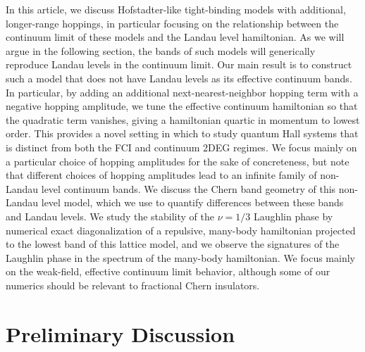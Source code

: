 \documentclass[aps,prb,twocolumn,letterpaper,twoside,nobalancelastpage,groupedaddress,amsmath,amssymb,floatfix,citeautoscript]{revtex4-1}
\begin{document}
In this article, we discuss Hofstadter-like tight-binding models with additional, longer-range hoppings, in particular focusing on the relationship between the continuum limit of these models and the Landau level hamiltonian. As we will argue in the following section, the bands of such models will generically reproduce Landau levels in the continuum limit. Our main result is to construct such a model that does not have Landau levels as its effective continuum bands. In particular, by adding an additional next-nearest-neighbor hopping term with a negative hopping amplitude, we tune the effective continuum hamiltonian so that the quadratic term vanishes, giving a hamiltonian quartic in momentum to lowest order. This provides a novel setting in which to study quantum Hall systems that is distinct from both the FCI and continuum 2DEG regimes. We focus mainly on a particular choice of hopping amplitudes for the sake of concreteness, but note that different choices of hopping amplitudes lead to an infinite family of non-Landau level continuum bands. We discuss the Chern band geometry of this non-Landau level model, which we use to quantify differences between these bands and Landau levels. We study the stability of the $\nu=1/3$ Laughlin phase by numerical exact diagonalization of a repulsive, many-body hamiltonian projected to the lowest band of this lattice model, and we observe the signatures of the Laughlin phase in the spectrum of the many-body hamiltonian. We focus mainly on the weak-field, effective continuum limit behavior, although some of our numerics should be relevant to fractional Chern insulators.



\section{Preliminary Discussion}
\end{document}

